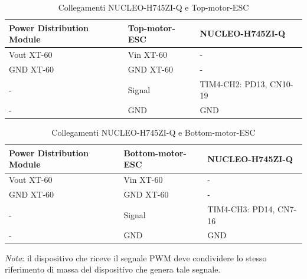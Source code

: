 \documentclass[11pt]{report}
\begin{document}
	\begin{table}[H]
		\centering
		\begin{tabular}{l l l}
			\toprule
			\textbf{Power Distribution Module} & \textbf{Top-motor-ESC} & \textbf{NUCLEO-H745ZI-Q} \\
			\midrule
			Vout XT-60 & Vin XT-60 & - \\
			GND XT-60 & GND XT-60 & - \\
			- & Signal & TIM4-CH2: PD13, CN10-19 \\
			- & GND & GND \\
			\bottomrule
		\end{tabular}
		\caption{Collegamenti NUCLEO-H745ZI-Q e Top-motor-ESC}
		\label{tab:collegamenti-top-esc}
	\end{table}
	
	\begin{table}[H]
		\centering
		\begin{tabular}{l l l}
			\toprule
			\textbf{Power Distribution Module} & \textbf{Bottom-motor-ESC} & \textbf{NUCLEO-H745ZI-Q} \\
			\midrule
			Vout XT-60 & Vin XT-60 & - \\
			GND XT-60 & GND XT-60 & - \\
			- & Signal & TIM4-CH3: PD14, CN7-16 \\
			- & GND & GND \\
			\bottomrule
		\end{tabular}
		\caption{Collegamenti NUCLEO-H745ZI-Q e Bottom-motor-ESC}
		\label{tab:collegamenti-bottom-esc}
	\end{table}
	
	\textit{Nota}: il dispositivo che riceve il segnale PWM deve condividere lo stesso riferimento di massa del dispositivo che genera tale segnale.
	
\end{document}
